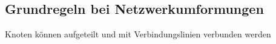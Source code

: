 										\subsection{Grundregeln bei Netzwerkumformungen}
					\fix \fix
										\beginip
										 	Knoten können aufgeteilt und mit Verbindungslinien verbunden werden\\
											\begin{center}
											\end{center}
										\iend

